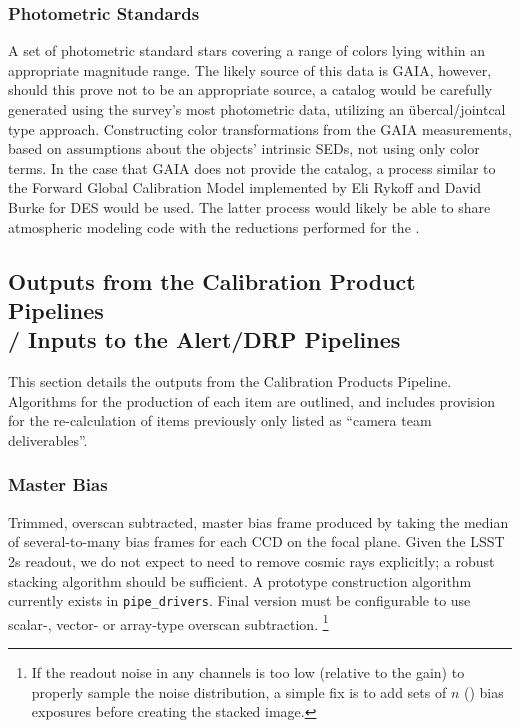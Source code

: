 \subsubsection{Photometric Standards}\label{sec:CPP:inputs:photometricStandards} 
A set of photometric standard stars covering a range of colors lying within an appropriate magnitude range. The likely source of this data is GAIA, however, should this prove not to be an appropriate source, a catalog would be carefully generated using the survey's most photometric data, utilizing an \"ubercal/jointcal type approach.
\alg Constructing color transformations from the GAIA measurements, based on assumptions about the objects' intrinsic SEDs, \ie not using only color terms. In the case that GAIA does not provide the catalog, a process similar to the Forward Global Calibration Model implemented by  Eli Rykoff and David Burke for DES would be used. The latter process would likely be able to share atmospheric modeling code with the reductions performed for the \auxtelescope.


\subsection{Outputs from the Calibration Product Pipelines \\
	/ Inputs to the Alert/DRP Pipelines}
\label{sec:CPP:output}

This section details the outputs from the Calibration Products Pipeline. Algorithms for the production of each item are outlined, and includes provision for the re-calculation of items previously only listed as ``camera team deliverables''.

\subsubsection{Master Bias}\label{sec:CPP:output:bias}
Trimmed, overscan subtracted, master bias frame produced by taking the median of several-to-many bias frames for each CCD on the focal plane. 
\alg Given the LSST 2s readout, we do not expect to need to remove cosmic rays explicitly; a robust stacking algorithm should be sufficient. A prototype construction algorithm currently exists in \texttt{pipe\_drivers}. Final version must be configurable to use scalar-, vector- or array-type overscan subtraction. 
\footnote{If the readout noise in any channels is too low (relative to the
gain) to properly sample the noise distribution, a simple fix is to add sets of $n$ () bias exposures before creating the stacked image.}


